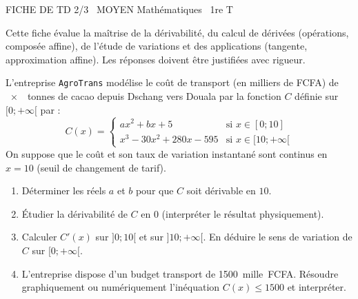 \documentclass[11pt]{article}
\begin{document}
\begin{tcolorbox}[enhanced,colback=popink,colframe=popink,arc=10pt,boxrule=0pt,left=12pt,right=12pt,top=9pt,bottom=9pt]
{\color{white}\popxbold\small FICHE DE TD 2/3 \textbullet\ MOYEN \hfill Mathématiques \textbullet\ 1re T\par}
\end{tcolorbox}
\vspace{4pt}
\noindent Cette fiche évalue la maîtrise de la dérivabilité, du calcul de dérivées (opérations, composée affine), de l'étude de variations et des applications (tangente, approximation affine). Les réponses doivent être justifiées avec rigueur.

\begin{exercice}
L'entreprise \texttt{AgroTrans} modélise le coût de transport (en milliers de FCFA) de \SI{x}{tonnes} de cacao depuis Dschang vers Douala par la fonction $C$ définie sur $[0; +\infty[$ par :
\[
C(x) = 
\begin{cases}
ax^2 + bx + 5 & \text{si } x \in [0; 10] \\
x^3 - 30x^2 + 280x - 595 & \text{si } x \in [10; +\infty[
\end{cases}
\]
On suppose que le coût et son taux de variation instantané sont continus en $x=10$ (seuil de changement de tarif).
\begin{enumerate}
    \item Déterminer les réels $a$ et $b$ pour que $C$ soit dérivable en $10$.
    \item Étudier la dérivabilité de $C$ en $0$ (interpréter le résultat physiquement).
    \item Calculer $C'(x)$ sur $]0; 10[$ et sur $]10; +\infty[$. En déduire le sens de variation de $C$ sur $[0; +\infty[$.
    \item L'entreprise dispose d'un budget transport de \SI{1500}{mille FCFA}. Résoudre graphiquement ou numériquement l'inéquation $C(x) \le 1500$ et interpréter.
\end{enumerate}
\end{exercice}
\end{document}
